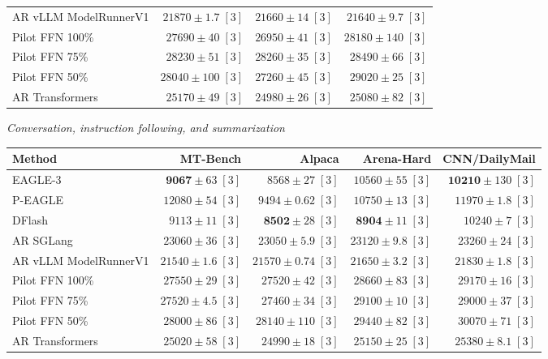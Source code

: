 \documentclass[conference,onecolumn]{IEEEtran}
\begin{document}
\begin{table}[!tp]
\begin{tabular}{@{}>{\raggedright\arraybackslash}p{3.7cm}rrr@{}}
AR \textperiodcentered{} vLLM ModelRunnerV1 & \(21870 \pm 1.7\;[3]\) & \(21660 \pm 14\;[3]\) & \(21640 \pm 9.7\;[3]\) \\
Pilot FFN 100\% & \(27690 \pm 40\;[3]\) & \(26950 \pm 41\;[3]\) & \(28180 \pm 140\;[3]\) \\
Pilot FFN 75\% & \(28230 \pm 51\;[3]\) & \(28260 \pm 35\;[3]\) & \(28490 \pm 66\;[3]\) \\
Pilot FFN 50\% & \(28040 \pm 100\;[3]\) & \(27260 \pm 45\;[3]\) & \(29020 \pm 25\;[3]\) \\
AR \textperiodcentered{} Transformers & \(25170 \pm 49\;[3]\) & \(24980 \pm 26\;[3]\) & \(25080 \pm 82\;[3]\) \\
\bottomrule
\end{tabular}
\par\medskip
\textit{Conversation, instruction following, and summarization}\par\smallskip
\begin{tabular}{@{}>{\raggedright\arraybackslash}p{3.7cm}rrrr@{}}
\toprule
Method & MT-Bench & Alpaca & Arena-Hard & CNN/DailyMail \\
\midrule
EAGLE-3 & \(\mathbf{9067} \pm 63\;[3]\) & \(8568 \pm 27\;[3]\) & \(10560 \pm 55\;[3]\) & \(\mathbf{10210} \pm 130\;[3]\) \\
P-EAGLE & \(12080 \pm 54\;[3]\) & \(9494 \pm 0.62\;[3]\) & \(10750 \pm 13\;[3]\) & \(11970 \pm 1.8\;[3]\) \\
DFlash & \(9113 \pm 11\;[3]\) & \(\mathbf{8502} \pm 28\;[3]\) & \(\mathbf{8904} \pm 11\;[3]\) & \(10240 \pm 7\;[3]\) \\
AR \textperiodcentered{} SGLang & \(23060 \pm 36\;[3]\) & \(23050 \pm 5.9\;[3]\) & \(23120 \pm 9.8\;[3]\) & \(23260 \pm 24\;[3]\) \\
AR \textperiodcentered{} vLLM ModelRunnerV1 & \(21540 \pm 1.6\;[3]\) & \(21570 \pm 0.74\;[3]\) & \(21650 \pm 3.2\;[3]\) & \(21830 \pm 1.8\;[3]\) \\
Pilot FFN 100\% & \(27550 \pm 29\;[3]\) & \(27520 \pm 42\;[3]\) & \(28660 \pm 83\;[3]\) & \(29170 \pm 16\;[3]\) \\
Pilot FFN 75\% & \(27520 \pm 4.5\;[3]\) & \(27460 \pm 34\;[3]\) & \(29100 \pm 10\;[3]\) & \(29000 \pm 37\;[3]\) \\
Pilot FFN 50\% & \(28000 \pm 86\;[3]\) & \(28140 \pm 110\;[3]\) & \(29440 \pm 82\;[3]\) & \(30070 \pm 71\;[3]\) \\
AR \textperiodcentered{} Transformers & \(25020 \pm 58\;[3]\) & \(24990 \pm 18\;[3]\) & \(25150 \pm 25\;[3]\) & \(25380 \pm 8.1\;[3]\) \\

\end{tabular}
\end{table}
\end{document}
